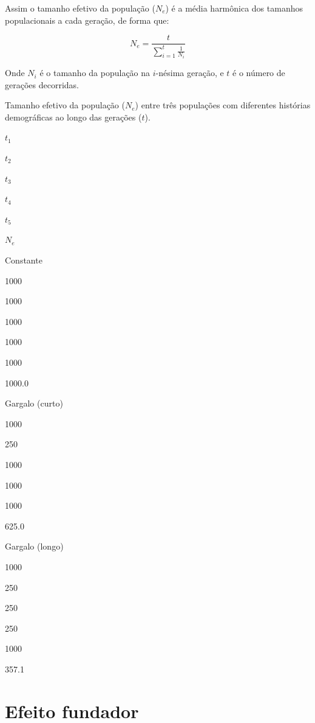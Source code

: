 \documentclass[
]{book}
\begin{document}
Assim o tamanho efetivo da população (\(N_e\)) é a média harmônica dos tamanhos populacionais a cada geração, de forma que:

\[N_e = \frac{t}{ \sum_{i=1}^t \frac{1}{N_i} } \]

Onde
\(N_i\) é o tamanho da população na \(i\)-nésima geração, e
\(t\) é o número de gerações decorridas.

\label{tab:table1101}Tamanho efetivo da população (\(N_e\)) entre três populações com diferentes histórias demográficas ao longo das gerações (\(t\)).

\(t_1\)

\(t_2\)

\(t_3\)

\(t_4\)

\(t_5\)

\(N_e\)

Constante

1000

1000

1000

1000

1000

1000.0

Gargalo (curto)

1000

250

1000

1000

1000

625.0

Gargalo (longo)

1000

250

250

250

1000

357.1

\hypertarget{efeito-fundador}{%
\section{Efeito fundador}\label{efeito-fundador}}
\end{document}
